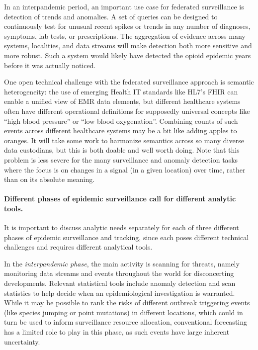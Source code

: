 \documentclass{article}
\begin{document}
In an interpandemic period, an important use case for federated surveillance is
detection of trends and anomalies.  A set of queries can be designed to
continuously test for unusual recent spikes or trends in any number of
diagnoses, symptoms, lab tests, or prescriptions.  The aggregation of evidence
across many systems, localities, and data streams will make detection both more
sensitive and more robust.  Such a system would likely have detected the opioid
epidemic years before it was actually noticed.

One open technical challenge with the federated surveillance approach is
semantic heterogeneity: the use of emerging Health IT standards like HL7's FHIR
\citep{HL7FHIR} can enable a unified view of EMR data elements, but different 
healthcare systems often have different operational definitions for supposedly
universal concepts like ``high blood pressure'' or ``low blood oxygenation''.
Combining counts of such events across different healthcare systems may be a bit
like adding apples to oranges.  It will take some work to harmonize semantics
across so many diverse data custodians, but this is both doable and well worth
doing.  Note that this problem is less severe for the many surveillance and
anomaly detection tasks where the focus is on changes in a signal (in a given
location) over time, rather than on its absolute meaning. 

\paragraph{Different phases of epidemic surveillance call for different analytic
  tools.}

It is important to discuss analytic needs separately for each of three different 
phases of epidemic surveillance and tracking, since each poses different
technical challenges and requires different analytical tools.

In the \emph{interpandemic phase}, the main activity is scanning for
threats, namely monitoring data streams and events throughout the world for
disconcerting developments.  Relevant statistical tools include anomaly
detection and scan statistics to help decide when an epidemiological
investigation is warranted.  While it may be possible to rank the risks of
different outbreak triggering events (like species jumping or point mutations)
in different locations, which could in turn be used to inform surveillance
resource allocation, conventional forecasting has a limited role to play in this
phase, as such events have large inherent uncertainty.  
\end{document}
